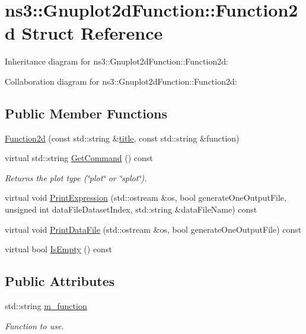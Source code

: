 \hypertarget{structns3_1_1Gnuplot2dFunction_1_1Function2d}{}\section{ns3\+:\+:Gnuplot2d\+Function\+:\+:Function2d Struct Reference}
\label{structns3_1_1Gnuplot2dFunction_1_1Function2d}


Inheritance diagram for ns3\+:\+:Gnuplot2d\+Function\+:\+:Function2d\+:


Collaboration diagram for ns3\+:\+:Gnuplot2d\+Function\+:\+:Function2d\+:
\subsection*{Public Member Functions}
\begin{DoxyCompactItemize}
\item 
\hyperlink{structns3_1_1Gnuplot2dFunction_1_1Function2d_a519d48053cff3a680b0868defe6f41c3}{Function2d} (const std\+::string \&\hyperlink{lte__link__budget__x2__handover__measures_8m_a3f4b991df405379f6917e1683ed5a8c8}{title}, const std\+::string \&function)
\item 
virtual std\+::string \hyperlink{structns3_1_1Gnuplot2dFunction_1_1Function2d_abbce7b8847442657b99606b52d94835f}{Get\+Command} () const 
\begin{DoxyCompactList}\small\item\em Returns the plot type (\char`\"{}plot\char`\"{} or \char`\"{}splot\char`\"{}). \end{DoxyCompactList}\item 
virtual void \hyperlink{structns3_1_1Gnuplot2dFunction_1_1Function2d_a24f903f2b45f57d4433ba98fee1f9800}{Print\+Expression} (std\+::ostream \&os, bool generate\+One\+Output\+File, unsigned int data\+File\+Dataset\+Index, std\+::string \&data\+File\+Name) const 
\item 
virtual void \hyperlink{structns3_1_1Gnuplot2dFunction_1_1Function2d_a57a88249cd45513cf047cc804cf299e8}{Print\+Data\+File} (std\+::ostream \&os, bool generate\+One\+Output\+File) const 
\item 
virtual bool \hyperlink{structns3_1_1Gnuplot2dFunction_1_1Function2d_ae86e366b7edc4160931c1905bee0f9e5}{Is\+Empty} () const 
\end{DoxyCompactItemize}
\subsection*{Public Attributes}
\begin{DoxyCompactItemize}
\item 
std\+::string \hyperlink{structns3_1_1Gnuplot2dFunction_1_1Function2d_a819a4f4f871e8736c9da8dbfde0ca24e}{m\+\_\+function}
\begin{DoxyCompactList}\small\item\em Function to use. \end{DoxyCompactList}\end{DoxyCompactItemize}


